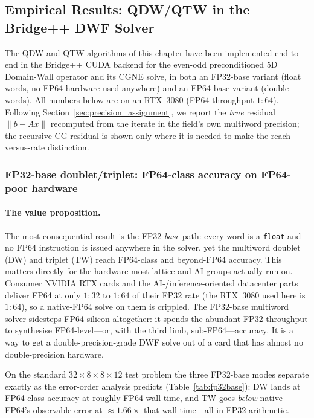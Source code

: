 \documentclass[12pt,a4paper]{article}
\begin{document}
\subsection{Empirical Results: QDW/QTW in the Bridge++ DWF Solver}
\label{sec:results}

The QDW and QTW algorithms of this chapter have been implemented end-to-end in
the Bridge++ CUDA backend for the even-odd preconditioned 5D Domain-Wall
operator and its CGNE solve, in both an FP32-base variant (float words, no FP64
hardware used anywhere) and an FP64-base variant (double words). All numbers
below are on an RTX~3080 (FP64 throughput $1\!:\!64$). Following
Section~\ref{sec:precision_assignment}, we report the \emph{true} residual
$\|b-Ax\|$ recomputed from the iterate in the field's own multiword precision;
the recursive CG residual is shown only where it is needed to make the
reach-versus-rate distinction.

\subsubsection{FP32-base doublet/triplet: FP64-class accuracy on FP64-poor hardware}

\paragraph{The value proposition.}
The most consequential result is the FP32-\emph{base} path: every word is a
\texttt{float} and no FP64 instruction is issued anywhere in the solver, yet the
multiword doublet (DW) and triplet (TW) reach FP64-class and beyond-FP64
accuracy. This matters directly for the hardware most lattice and AI groups
actually run on. Consumer NVIDIA RTX cards and the AI-/inference-oriented
datacenter parts deliver FP64 at only $1\!:\!32$ to $1\!:\!64$ of their FP32
rate (the RTX~3080 used here is $1\!:\!64$), so a native-FP64 solve on them is
crippled. The FP32-base multiword solver sidesteps FP64 silicon altogether: it
spends the abundant FP32 throughput to synthesise FP64-level---or, with the
third limb, sub-FP64---accuracy. It is a way to get a double-precision-grade
DWF solve out of a card that has almost no double-precision hardware.

On the standard $32\times8\times8\times12$ test problem the three FP32-base
modes separate exactly as the error-order analysis predicts
(Table~\ref{tab:fp32base}): DW lands at FP64-class accuracy at roughly FP64 wall
time, and TW goes \emph{below} native FP64's observable error at $\approx
1.66\times$ that wall time---all in FP32 arithmetic.
\end{document}
